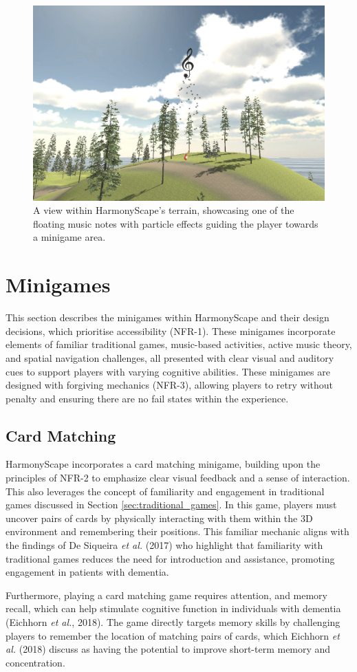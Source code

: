 \documentclass{l4proj}
\begin{document}
\begin{figure}[h]
    \centering
    \includegraphics[width=0.5\linewidth]{dissertation/images/floating_notes.png} 
    \caption{A view within HarmonyScape's terrain, showcasing one of the floating music notes with particle effects guiding the player towards a minigame area. }
    \label{fig:floating_notes} 
\end{figure}

\section{Minigames}
This section describes the minigames within HarmonyScape and their design decisions, which prioritise accessibility (NFR-1). These minigames incorporate elements of familiar traditional games, music-based activities, active music theory, and spatial navigation challenges, all presented with clear visual and auditory cues to support players with varying cognitive abilities. These minigames are designed with forgiving mechanics (NFR-3), allowing players to retry without penalty and ensuring there are no fail states within the experience.

\subsection{Card Matching}
HarmonyScape incorporates a card matching minigame, building upon the principles of NFR-2 to emphasize clear visual feedback and a sense of interaction. This also leverages the concept of familiarity and engagement in traditional games discussed in Section \ref{sec:traditional_games}. In this game, players must uncover pairs of cards by physically interacting with them within the 3D environment and remembering their positions. This familiar mechanic aligns with the findings of De Siqueira \emph{et al.} (2017) who highlight that familiarity with traditional games reduces the need for introduction and assistance, promoting engagement in patients with dementia.

Furthermore, playing a card matching game requires attention, and memory recall, which can help stimulate cognitive function in individuals with dementia (Eichhorn \emph{et al.}, 2018). The game directly targets memory skills by challenging players to remember the location of matching pairs of cards, which Eichhorn \emph{et al.} (2018) discuss as having the potential to improve short-term memory and concentration.
\end{document}
